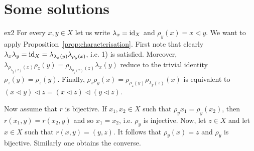 \section*{Some solutions}

\fancyhf{}
\fancyfoot[R]{\thepage}
\fancyhead[L]{\course}
\setlength{\headheight}{14pt}


\begin{sol}{ex2}
    For every $x,y \in X$ let us write $\lambda_x = \operatorname{id}_X$ and $\rho_y(x)=x \triangleleft y$.
    We want to apply Proposition~\ref{prop:characterisation}.
    First note that clearly $\lambda_x\lambda_y =\operatorname{id}_X = \lambda_{\lambda_x(y)}\lambda_{\rho_y(x)}$, i.e. 1) is satisfied. 
    Moreover,$\lambda_{\rho_{\lambda_y(z)}(x)}\rho_z(y)=\rho_{\lambda_{\rho_y(x)}(z)}\lambda_x(y)$ reduce to the trivial identity $\rho_z(y)=\rho_{z}(y)$.
    Finally,  $\rho_z\rho_y(x)=\rho_{\rho_z(y)}\rho_{\lambda_y(z)}(x)$ is equivalent to $(x\triangleleft y)\triangleleft z=(x\triangleleft z)\triangleleft(y\triangleleft z)$.

    Now assume that $r$ is bijective. If $x_1,x_2\in X$ such that $\rho_y{x_1}=\rho_y(x_2)$, then $r(x_1,y)=r(x_2,y)$ and so $x_1=x_2$, i.e. $\rho_y$ is injective. Now, let $z \in X$ and let $x\in X$ such that $r(x,y) =(y,z)$. It follows that $\rho_y(x)=z$ and $\rho_y$ is bijective. 
    Similarly one obtains the converse. 
\end{sol}